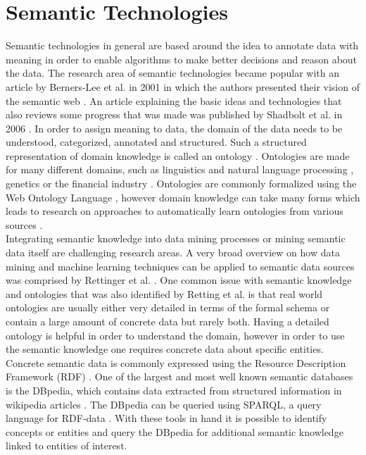\section{Semantic Technologies}
\label{subsec_semanticWeb}
Semantic technologies in general are based around the idea to annotate data with meaning in order to enable algorithms to make better decisions and reason about the data. The research area of semantic technologies became popular with an article by Berners-Lee et al. in 2001 in which the authors presented their vision of the semantic web \cite{berners2001semantic}. An article explaining the basic ideas and technologies that also reviews some progress that was made was published by Shadbolt et al. in 2006 \cite{shadbolt2006semantic}. In order to assign meaning to data, the domain of the data needs to be understood, categorized, annotated and structured. Such a structured representation of domain knowledge is called an ontology \cite{noy2004semantic}. Ontologies are made for many different domains, such as linguistics and natural language processing \cite{dahlgren1995linguistic}, genetics \cite{botstein2000gene} or the financial industry \cite{bennett2014adopting}. Ontologies are commonly formalized using the Web Ontology Language \cite{bechhofer2009owl}, however domain knowledge can take many forms which leads to research on approaches to automatically learn ontologies from various sources \cite{maedche2012ontology} \cite{ijntema2012lexico}. \\
Integrating semantic knowledge into data mining processes \cite{mabroukeh2009using} or mining semantic data itself \cite{stumme2006semantic} are challenging research areas. A very broad overview on how data mining and machine learning techniques can be applied to semantic data sources was comprised by Rettinger et al. \cite{rettinger2012mining}. One common issue with semantic knowledge and ontologies that was also identified by Retting et al. is that real world ontologies are usually either very detailed in terms of the formal schema or contain a large amount of concrete data but rarely both. Having a detailed ontology is helpful in order to understand the domain, however in order to use the semantic knowledge one requires concrete data about specific entities. Concrete semantic data is commonly expressed using the Resource Description Framework (RDF) \cite{miller1998introduction}. One of the largest and most well known semantic databases is the DBpedia, which contains data extracted from structured information in wikipedia articles \cite{auer2007dbpedia}. The DBpedia can be queried using SPARQL, a query language for RDF-data \cite{perez2006semantics}. With these tools in hand it is possible to identify concepts or entities and query the DBpedia for additional semantic knowledge linked to entities of interest.


